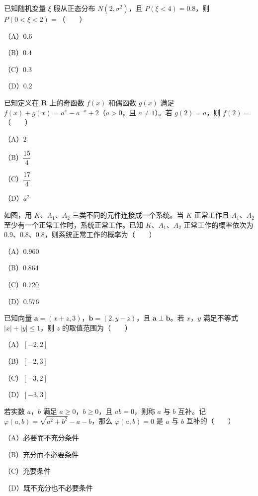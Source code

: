 \begin{question}
已知随机变量 $\xi$ 服从正态分布 $N(2,\sigma^2)$，且 $P(\xi<4)=0.8$，则 $P(0<\xi<2)=$\mbox{（　　）}

（A）$0.6$

（B）$0.4$

（C）$0.3$

（D）$0.2$

\end{question}
\begin{question}
已知定义在 $\mathbf R$ 上的奇函数 $f(x)$ 和偶函数 $g(x)$ 满足 $f(x)+g(x)=a^x-a^{-x}+2$（$a>0$，且 $a\neq1$）。若 $g(2)=a$，则 $f(2)=$\mbox{（　　）}

（A）$2$

（B）$\dfrac{15}4$

（C）$\dfrac{17}4$

（D）$a^2$

\Needspace{0.4\textheight}
\end{question}
\begin{question}
如图，用 $K$、$A_1$、$A_2$ 三类不同的元件连接成一个系统。当 $K$ 正常工作且 $A_1$、$A_2$ 至少有一个正常工作时，系统正常工作。已知 $K$、$A_1$、$A_2$ 正常工作的概率依次为 $0.9$、$0.8$、$0.8$，则系统正常工作的概率为\mbox{（　　）}

（A）$0.960$

（B）$0.864$

（C）$0.720$

（D）$0.576$
\nopagebreak[4]
\begin{center}\end{center}
\nopagebreak[4]
\end{question}
\begin{question}
已知向量 $\boldsymbol a=(x+z,3)$，$\boldsymbol b=(2,y-z)$，且 $\boldsymbol a\perp\boldsymbol b$。若 $x$，$y$ 满足不等式 $|x|+|y|\leqslant1$，则 $z$ 的取值范围为\mbox{（　　）}

（A）$[-2,2]$

（B）$[-2,3]$

（C）$[-3,2]$

（D）$[-3,3]$

\end{question}
\begin{question}
若实数 $a$，$b$ 满足 $a\geqslant0$，$b\geqslant0$，且 $ab=0$，则称 $a$ 与 $b$ 互补。记 $\varphi(a,b)=\sqrt{a^2+b^2}-a-b$，那么 $\varphi(a,b)=0$ 是 $a$ 与 $b$ 互补的\mbox{（　　）}

（A）必要而不充分条件

（B）充分而不必要条件

（C）充要条件

（D）既不充分也不必要条件

\end{question}
